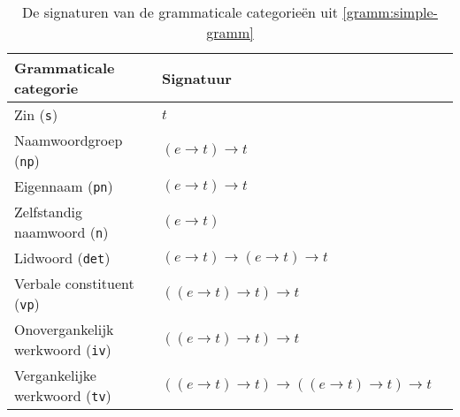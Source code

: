 \begin{table}[h]
  \begin{tabular}{@{}lll}
    \hline
    \textbf{Grammaticale categorie}             & \textbf{Signatuur} \\
    \hline 
    Zin (\texttt{s})                          & $t$ \\
    Naamwoordgroep (\texttt{np})              & $(e \rightarrow t) \rightarrow t$ \\
    Eigennaam (\texttt{pn})                   & $(e \rightarrow t) \rightarrow t$ \\
    Zelfstandig naamwoord (\texttt{n})        & $(e \rightarrow t)$ \\
    Lidwoord (\texttt{det})                   & $(e \rightarrow t) \rightarrow (e \rightarrow t) \rightarrow t$ \\
    Verbale constituent (\texttt{vp})         & $((e \rightarrow t) \rightarrow t) \rightarrow t$ \\
    Onovergankelijk werkwoord (\texttt{iv})   & $((e \rightarrow t) \rightarrow t) \rightarrow t$ \\
    Vergankelijke werkwoord (\texttt{tv})     & $((e \rightarrow t) \rightarrow t) \rightarrow ((e \rightarrow t) \rightarrow t) \rightarrow t$ \\
    \hline
  \end{tabular}
  \centering
  \caption{De signaturen van de grammaticale categorieën uit \autoref{gramm:simple-gramm}}
  \label{tbl:signaturen}
\end{table}

